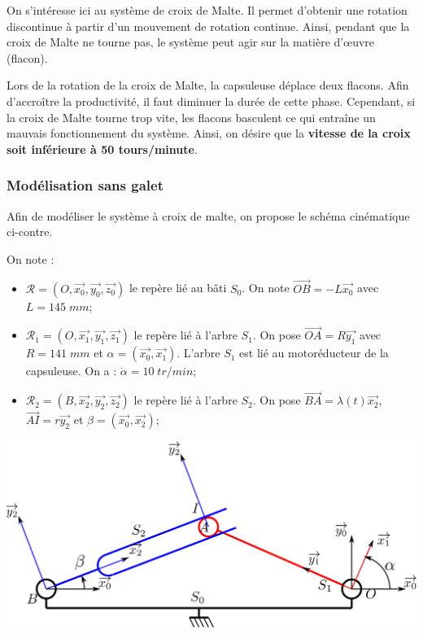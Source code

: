 \vspace{0.5cm}
On s'intéresse ici au système de croix de Malte. Il permet d'obtenir une rotation discontinue à partir d'un mouvement de rotation continue. Ainsi, pendant que la croix de Malte ne tourne pas, le système peut agir sur la matière d'\oe{}uvre (flacon).

Lors de la rotation de la croix de Malte, la capsuleuse déplace deux flacons. Afin d'accroître la productivité, il faut diminuer la durée de cette phase. Cependant, si la croix de Malte tourne trop vite, les flacons basculent ce qui entraîne un mauvais fonctionnement du système. Ainsi, on désire que la \textbf{vitesse de la croix soit inférieure à 50 tours/minute}. 


\subsubsection{Modélisation sans galet}

\begin{minipage}[c]{.4\linewidth}
Afin de modéliser le système à croix de malte, on propose le schéma cinématique ci-contre. 


On note :
\begin{itemize}
\item $\mathcal{R}=\left( O,\overrightarrow{x_0},\overrightarrow{y_0},\overrightarrow{z_0}\right)$ le repère lié au bâti $S_0$. On note $\overrightarrow{OB}=-L\overrightarrow{x_0}$ avec $L = 145\; mm$;
\item $\mathcal{R}_1=\left( O,\overrightarrow{x_1},\overrightarrow{y_1},\overrightarrow{z_1}\right)$ le repère lié à l'arbre $S_1$. On pose $\overrightarrow{OA}=R\overrightarrow{y_1}$  avec $R =141\;mm$ et $\alpha = \left( \overrightarrow{x_0}, \overrightarrow{x_1}\right)$. L'arbre $S_1$ est lié au motoréducteur de la capsuleuse. On a : $\dot{\alpha} = 10\;tr/min$;
\item  $\mathcal{R}_2=\left( B,\overrightarrow{x_2},\overrightarrow{y_2},\overrightarrow{z_2}\right)$ le repère lié à l'arbre $S_2$. On pose $\overrightarrow{BA}=\lambda(t)\overrightarrow{x_2}$,  $\overrightarrow{AI}=r\overrightarrow{y_2}$ et $\beta = \left( \overrightarrow{x_0}, \overrightarrow{x_2}\right)$;
\end{itemize}


\end{minipage} \hfill
\begin{minipage}[c]{.55\linewidth}
\begin{center}
 \includegraphics[width=\textwidth]{png/schema1}
\end{center}
\end{minipage}

